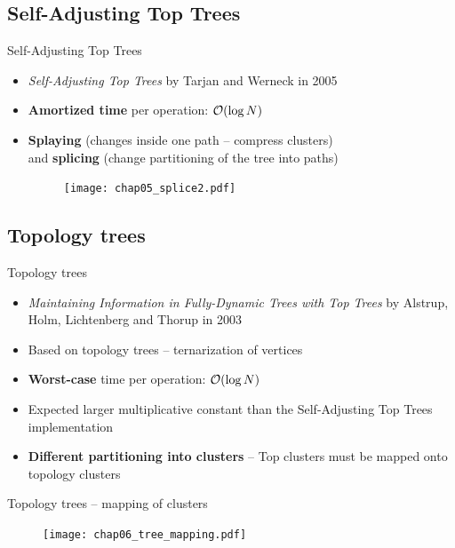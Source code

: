 \documentclass{beamer}				%
\begin{document}
\subsection{Self-Adjusting Top Trees}
\begin{frame}{Self-Adjusting Top Trees}

\begin{itemize}
\item {\it Self-Adjusting Top Trees} by Tarjan and Werneck in 2005
\pause
\item {\bf Amortized time} per operation: ${\cal O}(\log N)$
\bigskip\pause
\item {\bf Splaying} (changes inside one path -- compress clusters)\\ and {\bf
splicing} (change partitioning of the tree into paths)
	\smallskip
	\begin{figure}
	\centering
	\texttt{[image: chap05\_splice2.pdf]}
	\end{figure}
\end{itemize}

\end{frame}


\subsection{Topology trees}
\begin{frame}{Topology trees}

\begin{itemize}
\item {\it Maintaining Information in Fully-Dynamic Trees with Top Trees} by
Alstrup, Holm, Lichtenberg and Thorup in 2003
\bigskip\pause
\item Based on topology trees -- ternarization of vertices
\item {\bf Worst-case} time per operation: ${\cal O}(\log N)$
\item Expected larger multiplicative constant than the Self-Adjusting Top Trees implementation
\bigskip\pause
\item {\bf Different partitioning into clusters} -- Top clusters must be mapped onto topology clusters
\end{itemize}

\end{frame}

\begin{frame}{Topology trees -- mapping of clusters}
	\begin{figure}
	\centering
	\texttt{[image: chap06\_tree\_mapping.pdf]}
	\end{figure}
\end{frame}
\end{document}
